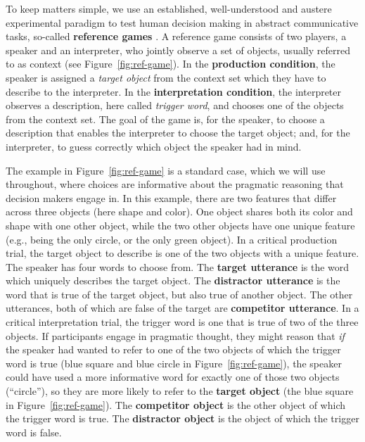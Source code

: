 \documentclass[fleqn]{article}
\begin{document}
To keep matters simple, we use an established, well-understood and austere experimental paradigm to test human decision making in abstract communicative tasks, so-called \textbf{reference games} \citep[e.g.,][]{FrankGoodman2012:Predicting-Prag,DegenFranke2013:Cost-Based-Prag,QingFranke2013:Variations-on-a,Frank2016:Rational-speech,SikosVenhuizen2021:Reevaluating-pr}.
A reference game consists of two players, a speaker and an interpreter, who jointly observe a set of objects, usually referred to as context (see Figure~\ref{fig:ref-game}).
In the \textbf{production condition}, the speaker is assigned a \emph{target object} from the context set which they have to describe to the interpreter.
In the \textbf{interpretation condition}, the interpreter observes a description, here called \emph{trigger word}, and chooses one of the objects from the context set.
The goal of the game is, for the speaker, to choose a description that enables the interpreter to choose the target object; and, for the interpreter, to guess correctly which object the speaker had in mind.

The example in Figure~\ref{fig:ref-game} is a standard case, which we will use throughout, where choices are informative about the pragmatic reasoning that decision makers engage in.
In this example, there are two features that differ across three objects (here shape and color).
One object shares both its color and shape with one other object, while the two other objects have one unique feature (e.g., being the only circle, or the only green object).
%
In a critical production trial, the target object to describe is one of the two objects with a unique feature.
The speaker has four words to choose from.
The \textbf{target utterance} is the word which uniquely describes the target object.
The \textbf{distractor utterance} is the word that is true of the target object, but also true of another object.
The other utterances, both of which are false of the target are \textbf{competitor utterance}.
%
In a critical interpretation trial, the trigger word is one that is true of two of the three objects.
If participants engage in pragmatic thought, they might reason that \emph{if} the speaker had wanted to refer to one of the two objects of which the trigger word is true (blue square and blue circle in Figure~\ref{fig:ref-game}), the speaker could have used a more informative word for exactly one of those two objects (``circle''), so they are more likely to refer to the \textbf{target object} (the blue square in Figure~\ref{fig:ref-game}).
The \textbf{competitor object} is the other object of which the trigger word is true.
The \textbf{distractor object} is the object of which the trigger word is false.
\end{document}

